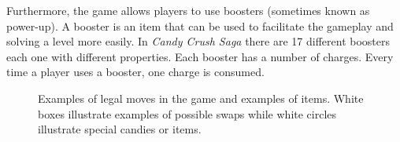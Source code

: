 Furthermore, the game allows players to use boosters (sometimes known as power-up). A booster is an item that can be used to facilitate the gameplay and solving a level more easily. In \textit{Candy Crush Saga} there are 17 different boosters each one with different properties. Each booster has a number of charges. Every time a player uses a booster, one charge is consumed. 
\begin{figure}[t]
  \centering
    
  
    \caption{Examples of legal moves in the game and examples of items. White boxes illustrate examples of possible swaps while white circles illustrate special candies or items.
    }
    \label{fig:candy}
\end{figure}
